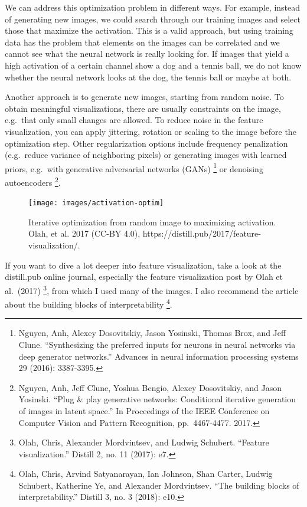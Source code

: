 \documentclass[
  11pt,
]{scrbook}
\begin{document}
We can address this optimization problem in different ways.
For example, instead of generating new images, we could search through our training images and select those that maximize the activation.
This is a valid approach, but using training data has the problem that elements on the images can be correlated and we cannot see what the neural network is really looking for.
If images that yield a high activation of a certain channel show a dog and a tennis ball, we do not know whether the neural network looks at the dog, the tennis ball or maybe at both.

Another approach is to generate new images, starting from random noise.
To obtain meaningful visualizations, there are usually constraints on the image, e.g.~that only small changes are allowed.
To reduce noise in the feature visualization, you can apply jittering, rotation or scaling to the image before the optimization step.
Other regularization options include frequency penalization (e.g.~reduce variance of neighboring pixels) or generating images with learned priors, e.g.~with generative adversarial networks (GANs) \footnote{Nguyen, Anh, Alexey Dosovitskiy, Jason Yosinski, Thomas Brox, and Jeff Clune. ``Synthesizing the preferred inputs for neurons in neural networks via deep generator networks.'' Advances in neural information processing systems 29 (2016): 3387-3395.} or denoising autoencoders \footnote{Nguyen, Anh, Jeff Clune, Yoshua Bengio, Alexey Dosovitskiy, and Jason Yosinski. ``Plug \& play generative networks: Conditional iterative generation of images in latent space.'' In Proceedings of the IEEE Conference on Computer Vision and Pattern Recognition, pp.~4467-4477. 2017.}.

\begin{figure}

{\centering \texttt{[image: images/activation-optim]} 

}

\caption{Iterative optimization from random image to maximizing activation. Olah, et al. 2017 (CC-BY 4.0), https://distill.pub/2017/feature-visualization/.}\label{fig:activation-optim}
\end{figure}

If you want to dive a lot deeper into feature visualization, take a look at the distill.pub online journal, especially the feature visualization post by Olah et al.~(2017) \footnote{Olah, Chris, Alexander Mordvintsev, and Ludwig Schubert. ``Feature visualization.'' Distill 2, no. 11 (2017): e7.}, from which I used many of the images.
I also recommend the article about the building blocks of interpretability \footnote{Olah, Chris, Arvind Satyanarayan, Ian Johnson, Shan Carter, Ludwig Schubert, Katherine Ye, and Alexander Mordvintsev. ``The building blocks of interpretability.'' Distill 3, no. 3 (2018): e10.}.
\end{document}

